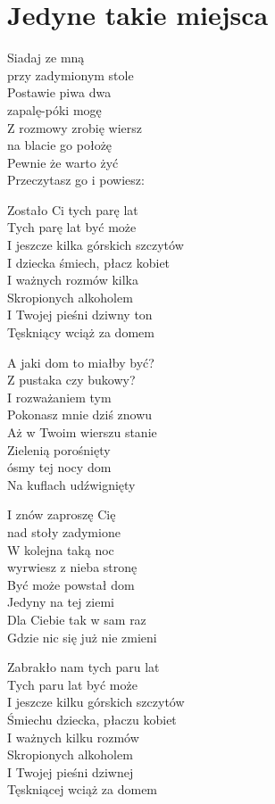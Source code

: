 \section{Jedyne takie miejsca}
\begin{text}
Siadaj ze mną\\
przy zadymionym stole\\
Postawie piwa dwa\\
zapalę-póki mogę\\
Z rozmowy zrobię wiersz\\
na blacie go położę\\
Pewnie że warto żyć\\
Przeczytasz go i powiesz:

Zostało Ci tych parę lat\\
Tych parę lat być może\\
I jeszcze kilka górskich szczytów\\
I dziecka śmiech, płacz kobiet\\
I ważnych rozmów kilka\\
Skropionych alkoholem\\
I Twojej pieśni dziwny ton\\
Tęskniący wciąż za domem

\vin A jaki dom to miałby być?\\
\vin Z pustaka czy bukowy?\\
\vin I rozważaniem tym\\
\vin Pokonasz mnie dziś znowu\\
\vin Aż w Twoim wierszu stanie\\
\vin Zielenią porośnięty\\
\vin ósmy tej nocy dom\\
\vin Na kuflach udźwignięty

I znów zaproszę Cię\\
nad stoły zadymione\\
W kolejna taką noc\\
wyrwiesz z nieba stronę\\
Być może powstał dom\\
Jedyny na tej ziemi\\
Dla Ciebie tak w sam raz\\
Gdzie nic się już nie zmieni

\vin Zabrakło nam tych paru lat\\
\vin Tych paru lat być może\\
\vin I jeszcze kilku górskich szczytów\\
\vin Śmiechu dziecka, płaczu kobiet\\
\vin I ważnych kilku rozmów\\
\vin Skropionych alkoholem\\
\vin I Twojej pieśni dziwnej\\
\vin Tęskniącej wciąż za domem
\end{text}